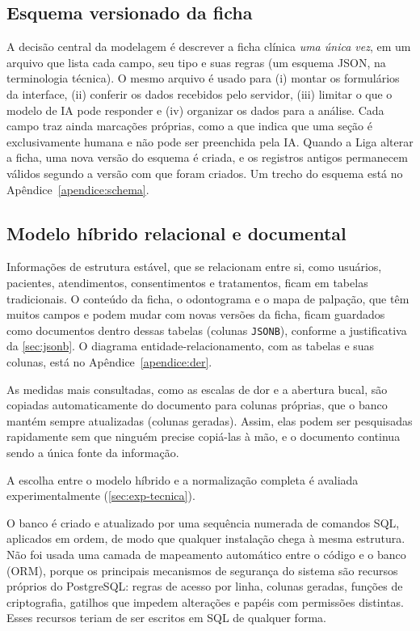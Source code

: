 \subsection{Esquema versionado da ficha}

A decisão central da modelagem é descrever a ficha clínica \emph{uma única vez}, em um arquivo que lista cada campo, seu tipo e suas regras (um esquema JSON, na terminologia técnica). O mesmo arquivo é usado para (i) montar os formulários da interface, (ii) conferir os dados recebidos pelo servidor, (iii) limitar o que o modelo de IA pode responder e (iv) organizar os dados para a análise. Cada campo traz ainda marcações próprias, como a que indica que uma seção é exclusivamente humana e não pode ser preenchida pela IA. Quando a Liga alterar a ficha, uma nova versão do esquema é criada, e os registros antigos permanecem válidos segundo a versão com que foram criados. Um trecho do esquema está no Apêndice~\ref{apendice:schema}.

\subsection{Modelo híbrido relacional e documental}

Informações de estrutura estável, que se relacionam entre si, como usuários, pacientes, atendimentos, consentimentos e tratamentos, ficam em tabelas tradicionais. O conteúdo da ficha, o odontograma e o mapa de palpação, que têm muitos campos e podem mudar com novas versões da ficha, ficam guardados como documentos dentro dessas tabelas (colunas \texttt{JSONB}), conforme a justificativa da \autoref{sec:jsonb}. O diagrama entidade-relacionamento, com as tabelas e suas colunas, está no Apêndice~\ref{apendice:der}.

As medidas mais consultadas, como as escalas de dor e a abertura bucal, são copiadas automaticamente do documento para colunas próprias, que o banco mantém sempre atualizadas (colunas geradas). Assim, elas podem ser pesquisadas rapidamente sem que ninguém precise copiá-las à mão, e o documento continua sendo a única fonte da informação.

A escolha entre o modelo híbrido e a normalização completa é avaliada experimentalmente (\autoref{sec:exp-tecnica}).

O banco é criado e atualizado por uma sequência numerada de comandos SQL, aplicados em ordem, de modo que qualquer instalação chega à mesma estrutura. Não foi usada uma camada de mapeamento automático entre o código e o banco (ORM), porque os principais mecanismos de segurança do sistema são recursos próprios do PostgreSQL: regras de acesso por linha, colunas geradas, funções de criptografia, gatilhos que impedem alterações e papéis com permissões distintas. Esses recursos teriam de ser escritos em SQL de qualquer forma.


